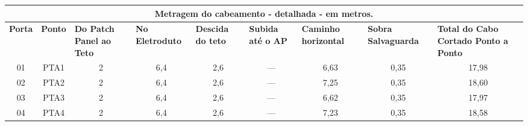 \documentclass[	DIV=calc,%
							paper=a4,%
							fontsize=12pt,%
							onecolumn]{scrartcl}	 					%
\begin{document}
{\centering
\begin{tabular}{|c|c|c|c|c|c|c|c|c|}
	\hline
	\multicolumn{9}{|c|}{\textbf{Metragem do cabeamento - detalhada - em metros.}}                                                                                                                                                                                                                                                                                                                                        \\ \hline
	\textbf{Porta}     & \textbf{Ponto}     & \multicolumn{1}{l|}{\textbf{Do Patch Panel ao Teto}} & \multicolumn{1}{l|}{\textbf{No Eletroduto}} & \multicolumn{1}{l|}{\textbf{Descida do teto}} & \multicolumn{1}{l|}{\textbf{Subida até o AP}} & \multicolumn{1}{l|}{\textbf{Caminho horizontal}} & \multicolumn{1}{l|}{\textbf{Sobra Salvaguarda}} & \multicolumn{1}{l|}{\textbf{Total do Cabo Cortado Ponto a Ponto}} \\ \hline
	01                 & PTA1               & 2                                                    & 6,4                                         & 2,6                                           & ---                                           & 6,63                                             & 0,35                                            & 17,98                                                             \\ \hline
	02                 & PTA2               & 2                                                    & 6,4                                         & 2,6                                           & ---                                           & 7,25                                             & 0,35                                            & 18,60                                                             \\ \hline
	03                 & PTA3               & 2                                                    & 6,4                                         & 2,6                                           & ---                                           & 6,62                                             & 0,35                                            & 17,97                                                             \\ \hline
	04                 & PTA4               & 2                                                    & 6,4                                         & 2,6                                           & ---                                           & 7,23                                             & 0,35                                            & 18,58                                                             \\ \hline

\end{tabular}}
\end{document}
